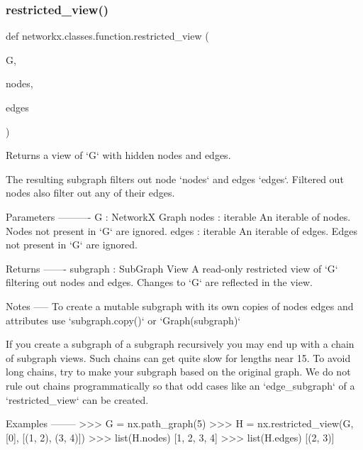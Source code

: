 \subsubsection{\texorpdfstring{restricted\+\_\+view()}{restricted\_view()}}
{\footnotesize\ttfamily def networkx.\+classes.\+function.\+restricted\+\_\+view (\begin{DoxyParamCaption}\item[{}]{G,  }\item[{}]{nodes,  }\item[{}]{edges }\end{DoxyParamCaption})}

\begin{DoxyVerb}Returns a view of `G` with hidden nodes and edges.

The resulting subgraph filters out node `nodes` and edges `edges`.
Filtered out nodes also filter out any of their edges.

Parameters
----------
G : NetworkX Graph
nodes : iterable
    An iterable of nodes. Nodes not present in `G` are ignored.
edges : iterable
    An iterable of edges. Edges not present in `G` are ignored.

Returns
-------
subgraph : SubGraph View
    A read-only restricted view of `G` filtering out nodes and edges.
    Changes to `G` are reflected in the view.

Notes
-----
To create a mutable subgraph with its own copies of nodes
edges and attributes use `subgraph.copy()` or `Graph(subgraph)`

If you create a subgraph of a subgraph recursively you may end up
with a chain of subgraph views. Such chains can get quite slow
for lengths near 15. To avoid long chains, try to make your subgraph
based on the original graph.  We do not rule out chains programmatically
so that odd cases like an `edge_subgraph` of a `restricted_view`
can be created.

Examples
--------
>>> G = nx.path_graph(5)
>>> H = nx.restricted_view(G, [0], [(1, 2), (3, 4)])
>>> list(H.nodes)
[1, 2, 3, 4]
>>> list(H.edges)
[(2, 3)]
\end{DoxyVerb}
 \mbox{\label{namespacenetworkx_1_1classes_1_1function_abb46104cf7b33e31d560f74b0d27029f}} 
